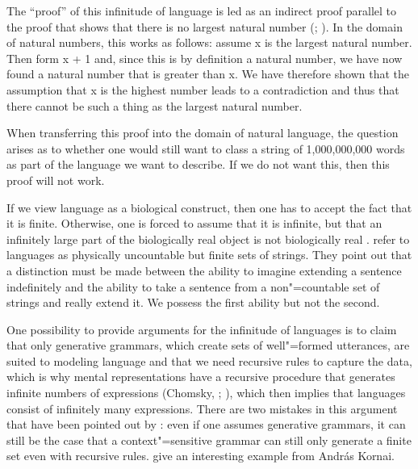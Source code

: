 The ``proof'' of this infinitude of language is led as an indirect proof parallel to the proof that shows
that there is no largest natural number (\citealp[--106]{Bierwisch66a}; \citealp[]{Pinker94a}). In the domain of natural numbers, this works
as follows: assume x is the largest natural number. Then form x + 1 and, since this is by definition a natural number, we have now found a natural number that is greater than x. We have therefore shown that the assumption that x is the highest number
leads to a contradiction and thus that there cannot be such a thing as the largest natural number.

When transferring this proof into the domain of natural language, the question arises as to whether one would still want to class 
a string of 1,000,000,000 words as part of the language we want to describe. If we do not want this, then this proof will not work.

If we view language as a biological construct, then one has to accept the fact that it is finite. Otherwise, one is forced to assume
that it is infinite, but that an infinitely large part of the biologically real object is not biologically real \citep[]{Postal2009a}. \citet{LL2011a} refer to languages as physically uncountable but finite sets of strings.
They point out that a distinction must be made between the ability to imagine extending a sentence indefinitely and the ability
to take a sentence from a non"=countable set of strings and really extend it. We possess the first ability but not the second.

One possibility to provide arguments for the infinitude of languages is to claim that only generative grammars,
which create sets of well"=formed utterances, are suited to modeling language and that we need recursive rules to capture the data, which
is why mental representations have a recursive procedure that generates infinite numbers of expressions (Chomsky, \citeyear[]{Chomsky56a-u}; \citeyear[--87]{Chomsky2002a-u}), which then implies that languages consist of infinitely many expressions.
There are two mistakes in this argument that have been pointed out by \citet{PS2010a}: 
even if one assumes generative grammars, it can still be the case that a context"=sensitive grammar can still only generate a finite set even with 
recursive rules. \citet[120--121]{PS2010a} give an interesting example from Andr{\'a}s Kornai.

